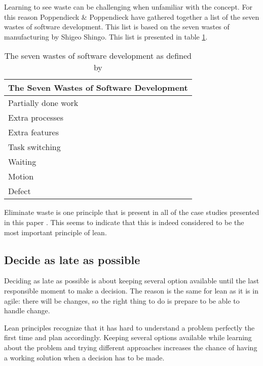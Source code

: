 Learning to see waste can be challenging when unfamiliar with the concept. For this reason Poppendieck \& Poppendieck have gathered together a list of the seven wastes of software development. This list is based on the seven wastes of manufacturing by Shigeo Shingo\cite{poppendieck2003lean}. This list is presented in table \ref{tbl:sevenwastes}.

\begin{table}
  \begin{tabular}{| l |}
    \hline
    The Seven Wastes of Software Development \\
    \hline
    Partially done work\\
    Extra processes\\
    Extra features\\
    Task switching\\
    Waiting\\
    Motion\\
    Defect\\
    \hline
  \end{tabular}
  \caption{The seven wastes of software development as defined by \cite{poppendieck2003lean}}
  \label{tbl:sevenwastes}
\end{table}

Eliminate waste is one principle that is present in all of the case studies presented in this paper \cite{Middleton2001Lean}\cite{Middleton2012Lean}\cite{Middleton2005Lean}\cite{Rodriguez2014Combining}. This seems to indicate that this is indeed considered to be the most important principle of lean.

\subsection{Decide as late as possible}

Deciding as late as possible is about keeping several option available until the last responsible moment to make a decision. The reason is the same for lean as it is in agile: there will be changes, so the right thing to do is prepare to be able to handle change.\cite{poppendieck2003lean}

Lean principles recognize that it has hard to understand a problem perfectly the first time and plan accordingly. Keeping several options available while learning about the problem and trying different approaches increases the chance of having a working solution when a decision has to be made. \cite{poppendieck2003lean}

